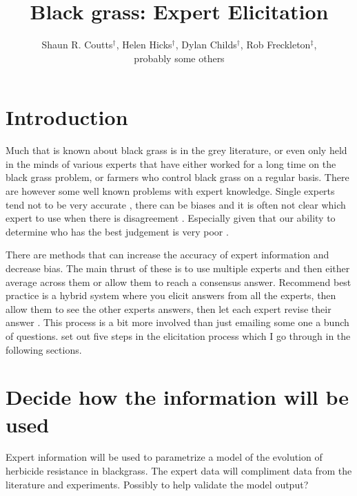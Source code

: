 \documentclass[12pt, a4paper]{article}
\begin{document}
\title{Black grass: Expert Elicitation}
\author{Shaun R. Coutts$^\dag$, Helen Hicks$^\dag$, Dylan Childs$^\dag$, Rob Freckleton$^\ddag$,\\ probably some others}
\maketitle

\section*{Introduction}
Much that is known about black grass is in the grey literature, or even only held in the minds of various experts that have either worked for a long time on the black grass problem, or farmers who control black grass on a regular basis. There are however some well known problems with expert knowledge. Single experts tend not to be very accurate \citep{Burg2014}, there can be biases and it is often not clear which expert to use when there is disagreement \citep{Burg2011, Mart2012}. Especially given that our ability to determine who has the best judgement is very poor \citep{Burg2011}.

There are methods that can increase the accuracy of expert information and decrease bias. The main thrust of these is to use multiple experts and then either average across them or allow them to reach a consensus answer. Recommend best practice is a hybrid system where you elicit answers from all the experts, then allow them to see the other experts answers, then let each expert revise their answer \citep{Mart2012}. This process is a bit more involved than just emailing some one a bunch of questions. \cite{Mart2012} set out five steps in the elicitation process which I go through in the following sections.

\section{Decide how the information will be used}
Expert information will be used to parametrize a model of the evolution of herbicide resistance in blackgrass. The expert data will compliment data from the literature and experiments. Possibly to help validate the model output? 
\end{document}
